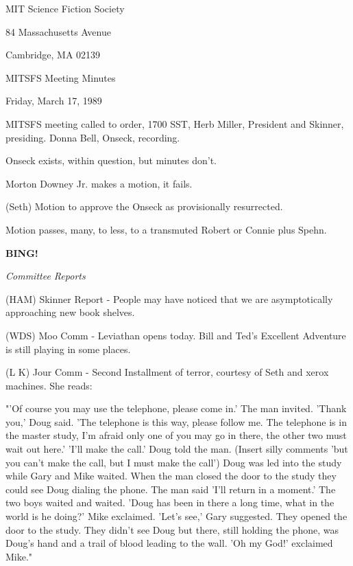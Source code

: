 \documentclass[12pt]{article}
\newcommand{\bing}{{\bf BING!} }
\newcommand{\goto}[1]{\bing \vskip 12pt \centerline{{\em{#1}}}}
\begin{document}
\begin{center}

MIT Science Fiction Society 

84 Massachusetts Avenue

Cambridge, MA 02139

\vspace{12pt}

MITSFS Meeting Minutes 

Friday, March 17, 1989

\end{center}
 
\vspace{18pt}

\setlength{\parskip}{6pt}

\noindent
MITSFS meeting called to order, 1700 SST, Herb Miller, President and Skinner, presiding. Donna Bell, Onseck, recording.

Onseck exists, within question, but minutes don't.

Morton Downey Jr. makes a motion, it fails.

(Seth) Motion to approve the Onseck as provisionally resurrected.

Motion passes, many, to less, to a transmuted Robert or Connie plus Spehn.

\goto{Committee Reports}

(HAM) Skinner Report - People may have noticed that we are asymptotically approaching new book shelves.

(WDS) Moo Comm - Leviathan opens today. Bill and Ted's Excellent Adventure is still playing in some places.
 
(L K) Jour Comm - Second Installment of terror, courtesy of Seth and xerox machines.  She reads:

"'Of course you may use the telephone, please come in.' The man invited. 'Thank you,' Doug said. 'The telephone is this way, please follow me. The telephone is in the master study, I'm afraid only one of you may go in there, the other two must wait out here.' 'I'll make the call.' Doug told the man. (Insert silly comments 'but you can't make the call, but I must make the call') Doug was led into the study while Gary and Mike waited. When the man closed the door to the study they could see Doug dialing the phone. The man said 'I'll return in a moment.' The two boys waited and waited. 'Doug has been in there a long time, what in the world is he doing?' Mike exclaimed.  'Let's see,' Gary suggested. They opened the door to the study. They didn't see Doug but there, still holding the phone, was Doug's hand and a trail of blood leading to the wall. 'Oh my God!' exclaimed Mike."
\end{document}
